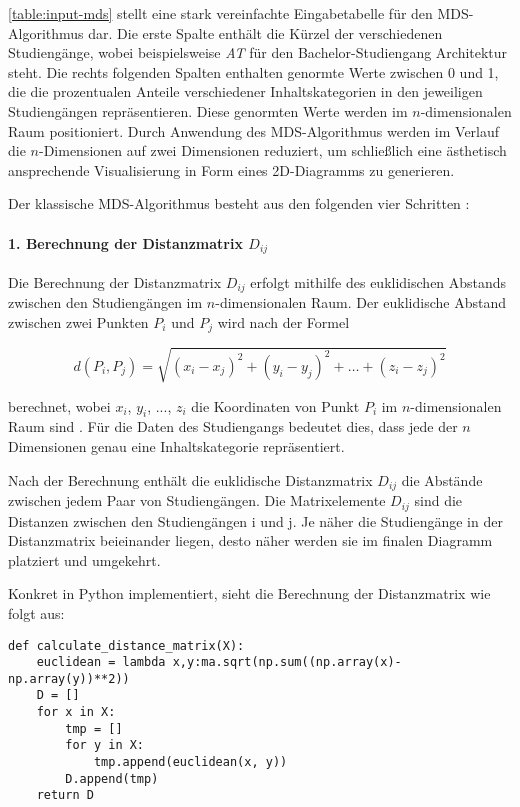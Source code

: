 \autoref{table:input-mds} stellt eine stark vereinfachte Eingabetabelle für den MDS-Algorithmus dar. Die erste Spalte enthält die Kürzel der verschiedenen Studiengänge, wobei beispielsweise \textit{AT} für den Bachelor-Studiengang Architektur steht. Die rechts folgenden Spalten enthalten genormte Werte zwischen 0 und 1, die die prozentualen Anteile verschiedener Inhaltskategorien in den jeweiligen Studiengängen repräsentieren. Diese genormten Werte werden im $n$-dimensionalen Raum positioniert. Durch Anwendung des MDS-Algorithmus werden im Verlauf die $n$-Dimensionen auf zwei Dimensionen reduziert, um schließlich eine ästhetisch ansprechende Visualisierung in Form eines 2D-Diagramms zu generieren.

\noindent
Der klassische MDS-Algorithmus besteht aus den folgenden vier Schritten
\parencite{imperial_multidimensional_2019}:

\paragraph*{1. Berechnung der Distanzmatrix $ D_{ij} $}\label{sec:distanzmatrix}
Die Berechnung der Distanzmatrix $ D_{ij} $ erfolgt mithilfe des euklidischen
Abstands zwischen den Studiengängen im $n$-dimensionalen Raum. Der euklidische
Abstand zwischen zwei Punkten $ P_{i} $ und $ P_{j} $ wird nach der Formel

$$ d(P_i, P_j) = \sqrt{(x_i - x_j)^2 + (y_i - y_j)^2 + \ldots + (z_i - z_j)^2} $$

berechnet, wobei $ x_{i} $, $ y_{i} $, ..., $ z_{i} $ die Koordinaten von Punkt
$ P_{i} $ im $n$-dimensionalen Raum sind \parencite{ceopedia_multidimensional_2018}. Für die Daten des Studiengangs bedeutet dies, dass jede der $n$ Dimensionen genau eine Inhaltskategorie repräsentiert.

Nach der Berechnung enthält die euklidische Distanzmatrix $ D_{ij} $ die Abstände zwischen jedem Paar von Studiengängen. Die Matrixelemente $ D_{ij} $ sind die Distanzen zwischen den Studiengängen i und j. Je näher die Studiengänge in der Distanzmatrix beieinander liegen, desto näher werden sie im finalen Diagramm platziert und umgekehrt.

\noindent
Konkret in Python implementiert, sieht die Berechnung der Distanzmatrix wie folgt aus:

\begin{lstlisting}[style=Python]
def calculate_distance_matrix(X):
    euclidean = lambda x,y:ma.sqrt(np.sum((np.array(x)-np.array(y))**2))
    D = []
    for x in X:
        tmp = []
        for y in X:
            tmp.append(euclidean(x, y))
        D.append(tmp)
    return D
\end{lstlisting}

